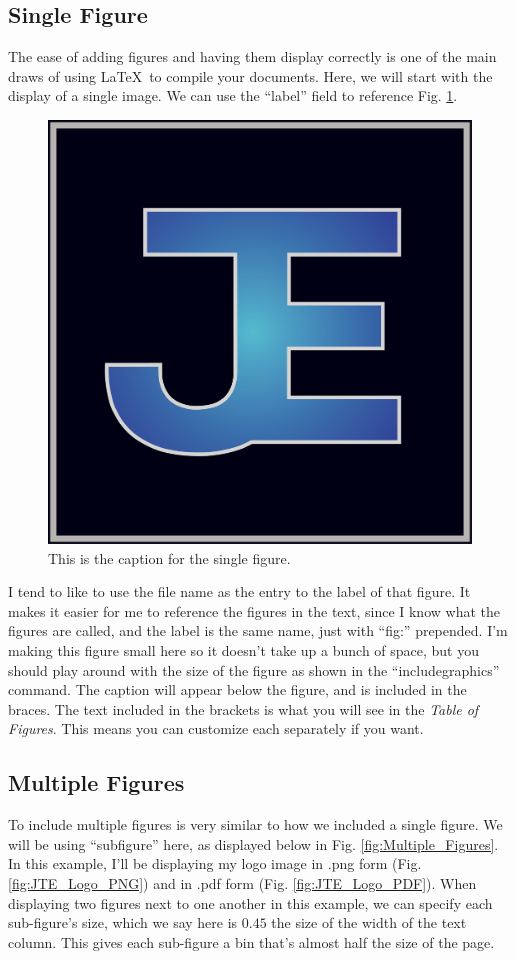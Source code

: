 \documentclass[letterpaper,12pt]{article}
\begin{document}
\subsection{Single Figure}
\label{subsec:Single_Figure}

The ease of adding figures and having them display correctly is one of the main draws of using \LaTeX \, to compile your documents.  Here, we will start with the display of a single image.  We can use the ``label'' field to reference Fig. \ref{fig:Single_Figure}.

\begin{figure}[h]
    \centering
    \includegraphics[width=0.2\linewidth]{Single_Figure.PNG}
    \caption[This single-figure text will show up in the \textit{List of Figures}.]{This is the caption for the single figure.}
    \label{fig:Single_Figure}
\end{figure}

I tend to like to use the file name as the entry to the label of that figure.  It makes it easier for me to reference the figures in the text, since I know what the figures are called, and the label is the same name, just with ``fig:'' prepended.  I'm making this figure small here so it doesn't take up a bunch of space, but you should play around with the size of the figure as shown in the ``includegraphics'' command.  The caption will appear below the figure, and is included in the braces.  The text included in the brackets is what you will see in the \textit{Table of Figures}.  This means you can customize each separately if you want.

\subsection{Multiple Figures}
\label{subsec:Multiple_Figures}

To include multiple figures is very similar to how we included a single figure.  We will be using ``subfigure'' here, as displayed below in Fig. \ref{fig:Multiple_Figures}.  In this example, I'll be displaying my logo image in .png form (Fig. \ref{fig:JTE_Logo_PNG}) and in .pdf form (Fig. \ref{fig:JTE_Logo_PDF}).  When displaying two figures next to one another in this example, we can specify each sub-figure's size, which we say here is $0.45$ the size of the width of the text column.  This gives each sub-figure a bin that's almost half the size of the page.
\end{document}
